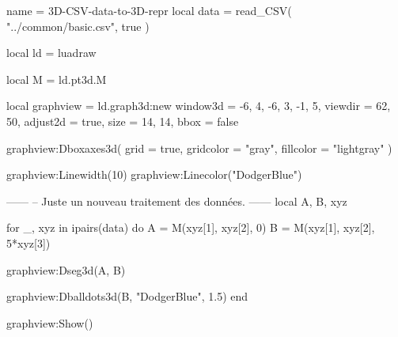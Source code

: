 \documentclass[border = 3pt]{standalone}
\begin{document}
\begin{luadraw*}{name = 3D-CSV-data-to-3D-repr}
local data = read_CSV(
  "../common/basic.csv",
  true
)

local ld = luadraw

local M = ld.pt3d.M

local graphview = ld.graph3d:new{
  window3d = {-6, 4, -6, 3, -1, 5},
  viewdir  = {62, 50},
  adjust2d = true,
  size     = {14, 14},
  bbox     = false
}

graphview:Dboxaxes3d({
  grid      = true,
  gridcolor = "gray",
  fillcolor = "lightgray"
})

graphview:Linewidth(10)
graphview:Linecolor("DodgerBlue")

------
-- Juste un nouveau traitement des données.
------
local A, B, xyz

for _, xyz in ipairs(data) do
  A = M(xyz[1], xyz[2], 0)
  B = M(xyz[1], xyz[2], 5*xyz[3])

  graphview:Dseg3d({A, B})

  graphview:Dballdots3d({B}, "DodgerBlue", 1.5)
end

graphview:Show()
\end{luadraw*}
\end{document}
